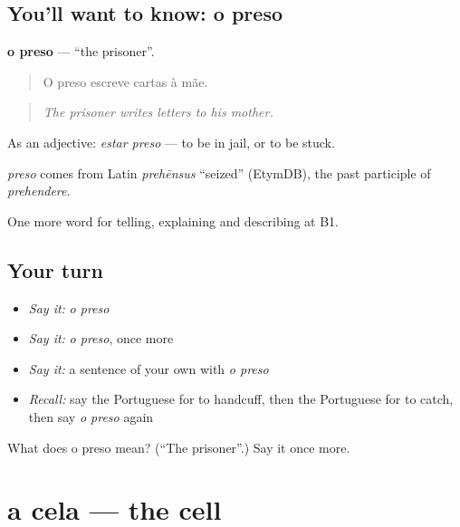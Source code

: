 \subsection*{You'll want to know: o preso}
\textbf{o preso} — \textquotedblleft{}the prisoner\textquotedblright{}.

\begin{quote}
O preso escreve cartas à mãe.
\end{quote}

\begin{quote}
\emph{The prisoner writes letters to his mother.}
\end{quote}

As an adjective: \emph{estar preso} — to be in jail, or to be stuck.

\begin{cousinweb}
\emph{preso} comes from Latin \emph{prehēnsus} \textquotedblleft{}seized\textquotedblright{} (EtymDB), the past participle of \emph{prehendere}.
\end{cousinweb}

\begin{grammarlens}[title={What you've built}]
One more word for telling, explaining and describing at B1.
\end{grammarlens}

\subsection*{Your turn}
\begin{itemize}
\raggedright
  \item \emph{Say it:} \emph{o preso}
  \item \emph{Say it:} \emph{o preso}, once more
  \item \emph{Say it:} a sentence of your own with \emph{o preso}
  \item \emph{Recall:} say the Portuguese for to handcuff, then the Portuguese for to catch, then say \emph{o preso} again
\end{itemize}

\begin{tcolorbox}[breakable,colback=teal!4,colframe=teal!35!black,title={Before you move on}]
What does o preso mean? (\textquotedblleft{}The prisoner\textquotedblright{}.) Say it once more.
\end{tcolorbox}
\section[a cela]{a cela — the cell}

